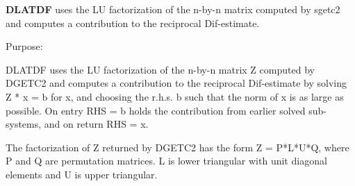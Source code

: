 {\bfseries D\+L\+A\+T\+D\+F} uses the L\+U factorization of the n-\/by-\/n matrix computed by sgetc2 and computes a contribution to the reciprocal Dif-\/estimate. 

 \begin{DoxyParagraph}{Purpose\+: }
\begin{DoxyVerb} DLATDF uses the LU factorization of the n-by-n matrix Z computed by
 DGETC2 and computes a contribution to the reciprocal Dif-estimate
 by solving Z * x = b for x, and choosing the r.h.s. b such that
 the norm of x is as large as possible. On entry RHS = b holds the
 contribution from earlier solved sub-systems, and on return RHS = x.

 The factorization of Z returned by DGETC2 has the form Z = P*L*U*Q,
 where P and Q are permutation matrices. L is lower triangular with
 unit diagonal elements and U is upper triangular.\end{DoxyVerb}
 
\end{DoxyParagraph}

